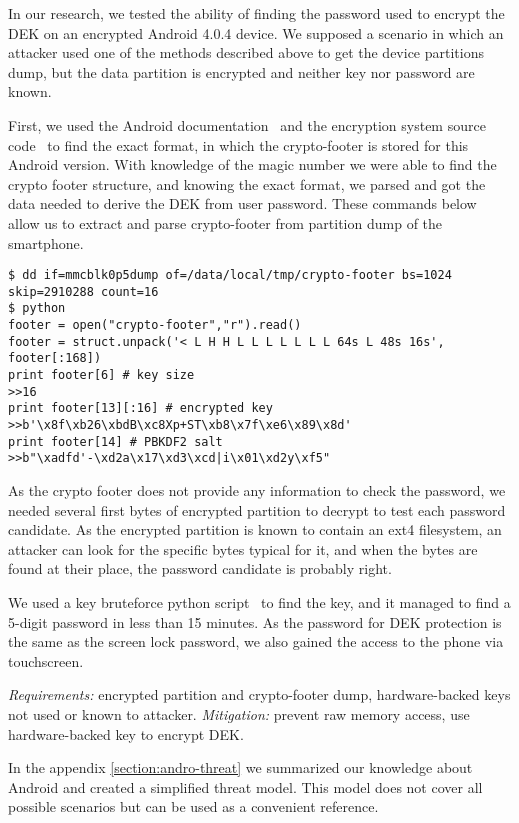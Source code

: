 In our research, we tested the ability of finding the password used to encrypt the DEK on an encrypted Android 4.0.4 device. We supposed a scenario in which an attacker used one of the methods described above to get the device partitions dump, but the data partition is encrypted and neither key nor password are known. 

First, we used the Android documentation~\cite{android2} and the encryption system source code~\cite{android5} to find the exact format, in which the crypto-footer is stored for this Android version. With knowledge of the magic number we were able to find the crypto footer structure, and knowing the exact format, we parsed and got the data needed to derive the DEK from user password. 
These commands below allow us to extract and parse crypto-footer from partition dump of the smartphone.

\begin{lstlisting}
$ dd if=mmcblk0p5dump of=/data/local/tmp/crypto-footer bs=1024 skip=2910288 count=16
$ python
footer = open("crypto-footer","r").read()
footer = struct.unpack('< L H H L L L L L L L 64s L 48s 16s', footer[:168])
print footer[6] # key size
>>16
print footer[13][:16] # encrypted key
>>b'\x8f\xb26\xbdB\xc8Xp+ST\xb8\x7f\xe6\x89\x8d'
print footer[14] # PBKDF2 salt
>>b"\xadfd'-\xd2a\x17\xd3\xcd|i\x01\xd2y\xf5"
\end{lstlisting}

As the crypto footer does not provide any information to check the password, we needed several first bytes of encrypted partition to decrypt to test each password candidate. As the encrypted partition is known to contain an ext4 filesystem, an attacker can look for the specific bytes typical for it, and when the bytes are found at their place, the password candidate is probably right.

We used a key bruteforce python script~\cite{android6} to find the key, and it managed to find a 5-digit password in less than 15 minutes. As the password for DEK protection is the same as the screen lock password, we also gained the access to the phone via touchscreen.

\textsl{Requirements:} encrypted partition and crypto-footer dump, hardware-backed keys not used or known to attacker.
\textsl{Mitigation:} prevent raw memory access, use hardware-backed key to encrypt DEK.


In the appendix \ref{section:andro-threat} we summarized our knowledge about Android and created a simplified threat model. This model does not cover all possible scenarios but can be used as a convenient reference.




